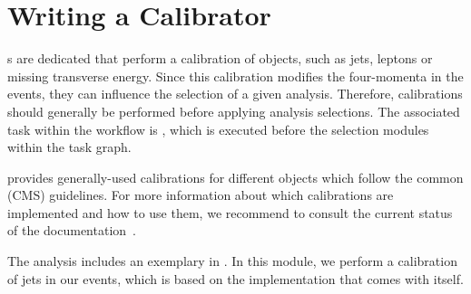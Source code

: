 \section{Writing a Calibrator}\label{sec:calibrator}

s are dedicated  that perform a calibration of objects, such as jets, leptons or missing transverse energy.
Since this calibration modifies the four-momenta in the events, they can influence the selection of a given analysis.
Therefore, calibrations should generally be performed before applying analysis selections.
The associated task within the workflow is , which is executed before the selection modules within the task graph.

\columnflow provides generally-used calibrations for different objects which follow the common (CMS) guidelines.
For more information about which calibrations are implemented and how to use them, we recommend to consult the current status of the documentation~\cite{cf_repo}.

The  analysis includes an exemplary  in .
In this module, we perform a calibration of jets in our events, which is based on the implementation that comes with \columnflow itself.

%	
%	
%	
%	
%	
%	
%	
%	
%	
%	
%	
%	
%	

